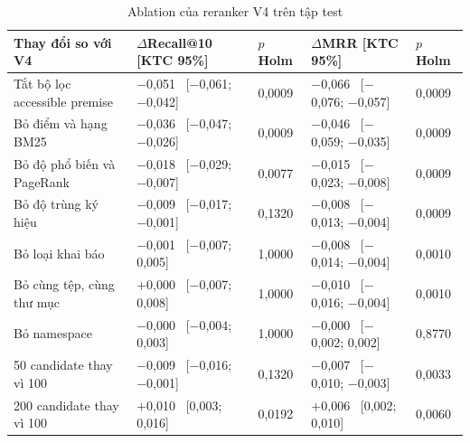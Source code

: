 \begin{table}[htbp]
\centering
\setlength{\tabcolsep}{4pt}
\caption[Ablation của reranker]{Ablation của reranker V4 trên tập test }\label{tab:ablation}
\begin{tabular}{@{}lllll@{}}
\toprule
Thay đổi so với V4 & $\Delta$Recall@10 [KTC 95\%] & $p$ Holm & $\Delta$MRR [KTC 95\%] & $p$ Holm \\
\midrule
Tắt bộ lọc accessible premise & $-$0,051 \ [$-$0,061; $-$0,042] & 0,0009 & $-$0,066 \ [$-$0,076; $-$0,057] & 0,0009 \\
Bỏ điểm và hạng BM25 & $-$0,036 \ [$-$0,047; $-$0,026] & 0,0009 & $-$0,046 \ [$-$0,059; $-$0,035] & 0,0009 \\
Bỏ độ phổ biến và PageRank & $-$0,018 \ [$-$0,029; $-$0,007] & 0,0077 & $-$0,015 \ [$-$0,023; $-$0,008] & 0,0009 \\
Bỏ độ trùng ký hiệu & $-$0,009 \ [$-$0,017; $-$0,001] & 0,1320 & $-$0,008 \ [$-$0,013; $-$0,004] & 0,0009 \\
Bỏ loại khai báo & $-$0,001 \ [$-$0,007; 0,005] & 1,0000 & $-$0,008 \ [$-$0,014; $-$0,004] & 0,0010 \\
Bỏ cùng tệp, cùng thư mục & $+$0,000 \ [$-$0,007; 0,008] & 1,0000 & $-$0,010 \ [$-$0,016; $-$0,004] & 0,0010 \\
Bỏ namespace & $-$0,000 \ [$-$0,004; 0,003] & 1,0000 & $-$0,000 \ [$-$0,002; 0,002] & 0,8770 \\
\midrule
50 candidate thay vì 100 & $-$0,009 \ [$-$0,016; $-$0,001] & 0,1320 & $-$0,007 \ [$-$0,010; $-$0,003] & 0,0033 \\
200 candidate thay vì 100 & $+$0,010 \ [0,003; 0,016] & 0,0192 & $+$0,006 \ [0,002; 0,010] & 0,0060 \\
\bottomrule
\end{tabular}
\par{}
\end{table}
